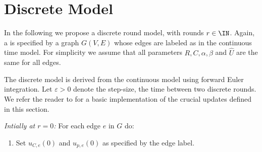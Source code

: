 
\section{Discrete Model}\label{sec:discrete}

In the following we propose a discrete round model, with rounds $r \in \IN$.
Again, a \Pn is specified by a graph $G(V,E)$ whose edges are labeled as in the continuous time model.
For simplicity we assume that all parameters $R,C,\alpha,\beta$ and $\hat{U}$ are the same for all edges.

The discrete model is derived from the continuous model using forward Euler integration. Let $\varepsilon > 0$ denote the step-size, \ie the time between two discrete rounds. We refer the reader to  for a basic implementation of the crucial updates defined in this section.

\medskip

\noindent
{\em Intially at $r=0$:}
For each edge $e$ in $G$ do:  
\begin{enumerate}
\item Set $u_{C,e}(0)$ and $u_{p,e}(0)$ as specified by the edge label.
\end{enumerate}

\medskip

